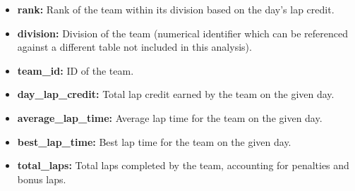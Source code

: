 \documentclass[11pt]{article}
\begin{document}
\begin{itemize}
    \item \textbf{rank:} Rank of the team within its division based on the day's lap credit.
    \item \textbf{division:} Division of the team (numerical identifier which can be referenced against a different table not included in this analysis).
    \item \textbf{team\_id:} ID of the team.
    \item \textbf{day\_lap\_credit:} Total lap credit earned by the team on the given day.
    \item \textbf{average\_lap\_time:} Average lap time for the team on the given day.
    \item \textbf{best\_lap\_time:} Best lap time for the team on the given day.
    \item \textbf{total\_laps:} Total laps completed by the team, accounting for penalties and bonus laps.
\end{itemize}
\end{document}
